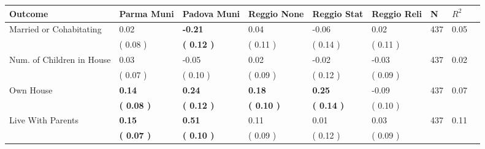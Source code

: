\begin{tabular}{L{6.2cm} C{1.8cm} C{1.8cm} C{1.8cm} C{1.8cm} C{1.8cm} C{1.8cm} C{0.3cm} C{0.3cm}}
\toprule
 \textbf{Outcome} & \textbf{Parma Muni} & \textbf{Padova Muni} & \textbf{Reggio None} & \textbf{Reggio Stat} & \textbf{Reggio Reli} & \textbf{N} & \textbf{$ R^2$} \\
\midrule
Married or Cohabitating &      0.02 & \textbf{    -0.21} &      0.04 &     -0.06 &      0.02  & 437 &       0.05 \\ 
 & (     0.08 ) & \textbf{(     0.12 )} & (     0.11 ) & (     0.14 ) & (     0.11 )  & \\
Num. of Children in House &      0.03 &     -0.05 &      0.02 &     -0.02 &     -0.03  & 437 &       0.02 \\ 
 & (     0.07 ) & (     0.10 ) & (     0.09 ) & (     0.12 ) & (     0.09 )  & \\
Own House & \textbf{     0.14} & \textbf{     0.24} & \textbf{     0.18} & \textbf{     0.25} &     -0.09  & 437 &       0.07 \\ 
 & \textbf{(     0.08 )} & \textbf{(     0.12 )} & \textbf{(     0.10 )} & \textbf{(     0.14 )} & (     0.10 )  & \\
Live With Parents & \textbf{     0.15} & \textbf{     0.51} &      0.11 &      0.01 &      0.03  & 437 &       0.11 \\ 
 & \textbf{(     0.07 )} & \textbf{(     0.10 )} & (     0.09 ) & (     0.12 ) & (     0.09 )  & \\
\bottomrule
\end{tabular}

